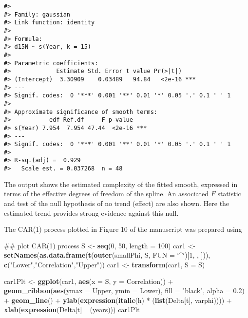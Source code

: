 \documentclass[12pt,]{article}
\newenvironment{Shaded}{\begin{snugshade}}{\end{snugshade}}
\newcommand{\KeywordTok}[1]{\textcolor[rgb]{0.13,0.29,0.53}{\textbf{{#1}}}}
\newcommand{\DataTypeTok}[1]{\textcolor[rgb]{0.13,0.29,0.53}{{#1}}}
\newcommand{\DecValTok}[1]{\textcolor[rgb]{0.00,0.00,0.81}{{#1}}}
\newcommand{\FloatTok}[1]{\textcolor[rgb]{0.00,0.00,0.81}{{#1}}}
\newcommand{\StringTok}[1]{\textcolor[rgb]{0.31,0.60,0.02}{{#1}}}
\newcommand{\NormalTok}[1]{{#1}}
\begin{document}
\begin{verbatim}
#> 
#> Family: gaussian 
#> Link function: identity 
#> 
#> Formula:
#> d15N ~ s(Year, k = 15)
#> 
#> Parametric coefficients:
#>             Estimate Std. Error t value Pr(>|t|)    
#> (Intercept)  3.30909    0.03489   94.84   <2e-16 ***
#> ---
#> Signif. codes:  0 '***' 0.001 '**' 0.01 '*' 0.05 '.' 0.1 ' ' 1
#> 
#> Approximate significance of smooth terms:
#>           edf Ref.df     F p-value    
#> s(Year) 7.954  7.954 47.44  <2e-16 ***
#> ---
#> Signif. codes:  0 '***' 0.001 '**' 0.01 '*' 0.05 '.' 0.1 ' ' 1
#> 
#> R-sq.(adj) =  0.929   
#>   Scale est. = 0.037268  n = 48
\end{verbatim}

The output shows the estimated complexity of the fitted smooth,
expressed in terms of the effective degrees of freedom of the spline. An
associated \(F\) statistic and test of the null hypothesis of no trend
(effect) are also shown. Here the estimated trend provides strong
evidence against this null.

The CAR(1) process plotted in Figure 10 of the manuscript was prepared
using

\begin{Shaded}
\begin{Highlighting}[]
\NormalTok{## plot CAR(1) process}
\NormalTok{S <-}\StringTok{ }\KeywordTok{seq}\NormalTok{(}\DecValTok{0}\NormalTok{, }\DecValTok{50}\NormalTok{, }\DataTypeTok{length =} \DecValTok{100}\NormalTok{)}
\NormalTok{car1 <-}\StringTok{ }\KeywordTok{setNames}\NormalTok{(}\KeywordTok{as.data.frame}\NormalTok{(}\KeywordTok{t}\NormalTok{(}\KeywordTok{outer}\NormalTok{(smallPhi, S, }\DataTypeTok{FUN =} \StringTok{`}\DataTypeTok{^}\StringTok{`}\NormalTok{)[}\DecValTok{1}\NormalTok{, , ])),}
                 \KeywordTok{c}\NormalTok{(}\StringTok{"Lower"}\NormalTok{,}\StringTok{"Correlation"}\NormalTok{,}\StringTok{"Upper"}\NormalTok{))}
\NormalTok{car1 <-}\StringTok{ }\KeywordTok{transform}\NormalTok{(car1, }\DataTypeTok{S =} \NormalTok{S)}

\NormalTok{car1Plt <-}\StringTok{ }\KeywordTok{ggplot}\NormalTok{(car1, }\KeywordTok{aes}\NormalTok{(}\DataTypeTok{x =} \NormalTok{S, }\DataTypeTok{y =} \NormalTok{Correlation)) +}
\StringTok{    }\KeywordTok{geom_ribbon}\NormalTok{(}\KeywordTok{aes}\NormalTok{(}\DataTypeTok{ymax =} \NormalTok{Upper, }\DataTypeTok{ymin =} \NormalTok{Lower),}
                \DataTypeTok{fill =} \StringTok{"black"}\NormalTok{, }\DataTypeTok{alpha =} \FloatTok{0.2}\NormalTok{) +}
\StringTok{    }\KeywordTok{geom_line}\NormalTok{() +}
\StringTok{    }\KeywordTok{ylab}\NormalTok{(}\KeywordTok{expression}\NormalTok{(}\KeywordTok{italic}\NormalTok{(h) *}\StringTok{ }\NormalTok{(}\KeywordTok{list}\NormalTok{(Delta[t], varphi)))) +}
\StringTok{    }\KeywordTok{xlab}\NormalTok{(}\KeywordTok{expression}\NormalTok{(Delta[t] ~}\StringTok{ }\NormalTok{(years)))}
\NormalTok{car1Plt}
\end{Highlighting}
\end{Shaded}
\end{document}
